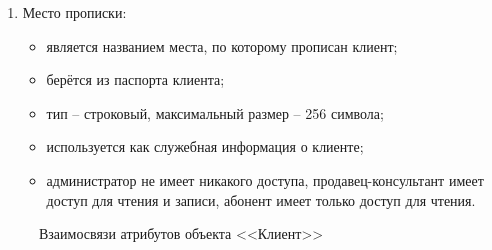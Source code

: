 \begin{enumerate}
\begin{enumerate}
        \item Место прописки:
        \begin{itemize}
            \item является названием места, по которому прописан клиент;
            \item берётся из паспорта клиента;
            \item тип -- строковый, максимальный размер -- 256 символа;
            \item используется как служебная информация о клиенте;
            \item администратор не имеет никакого доступа, продавец-консультант имеет доступ для чтения и записи, абонент имеет только доступ для чтения.
        \end{itemize}
    \end{enumerate}
    \begin{figure}[H]
        \label{fig:client-attributes}
        \caption{Взаимосвязи атрибутов объекта <<Клиент>>}
    \end{figure}


\end{enumerate}
